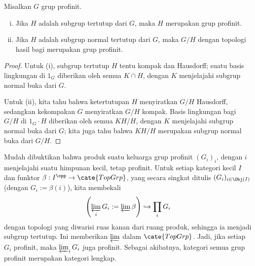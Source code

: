 \begin{proposition}
	Misalkan $G$ grup profinit.
	\begin{enumerate}[(i)]
		\item Jika $H$ adalah subgrup tertutup dari $G$, maka $H$ merupakan grup profinit.
		\item Jika $H$ adalah subgrup normal tertutup dari $G$, maka $G/H$ dengan topologi hasil bagi merupakan grup profinit.
	\end{enumerate}
\end{proposition}
\begin{proof}
	Untuk (i), subgrup tertutup $H$ tentu kompak dan Hausdorff; suatu basis lingkungan di $1_G$ diberikan oleh semua $K \cap H$, dengan $K$ menjelajahi subgrup normal buka dari $G$.
	
	Untuk (ii), kita tahu bahwa ketertutupan $H$ menyiratkan $G/H$ Hausdorff, sedangkan kekompakan $G$ menyiratkan $G/H$ kompak. Basis lingkungan bagi $G/H$ di $1_G \cdot H$ diberikan oleh semua $KH/H$, dengan $K$ menjelajahi subgrup normal buka dari $G$; kita juga tahu bahwa $KH/H$ merupakan subgrup normal buka dari $G/H$.
\end{proof}

Mudah dibuktikan bahwa produk suatu keluarga grup profinit $(G_i)_i$, dengan $i$ menjelajahi suatu himpunan kecil, tetap profinit. Untuk setiap kategori kecil $I$ dan funktor $\beta: I^{\opp} \to \cate{TopGrp}$, yang secara singkat ditulis $(G_i)_{i \in \Obj(I)}$ (dengan $G_i := \beta(i)$), kita membekali
\[ \left( \varprojlim_i G_i := \varprojlim \beta \right) \hookrightarrow \prod_i G_i \]
dengan topologi yang diwarisi ruas kanan dari ruang produk, sehingga ia menjadi subgrup tertutup. Ini memberikan $\varprojlim$ dalam $\cate{TopGrp}$. Jadi, jika setiap $G_i$ profinit, maka $\varprojlim_i G_i$ juga profinit. Sebagai akibatnya, kategori semua grup profinit merupakan kategori lengkap.

